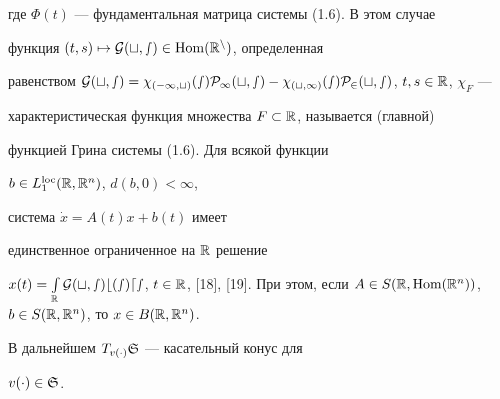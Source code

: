 где $\Phi(t)$ --- фундаментальная матрица системы (1.6). В этом случае


функция $(t,s)\mapsto\cal G(t,s)\in\operatorname{Hom}(\Bbb R^{n})$, определенная


равенством $\pG(t,s)=\chi_{(-\infty,t)}(s)P_{1}(t,s)-


\chi_{(t,\infty)}(s)P_{2}(t,s)$, $t,s\in\R$, $\chi_{F}$ ---


характеристическая функция множества $F\subset\Bbb R$, называется (главной)


функцией Грина системы (1.6). Для всякой функции


$b\in L_{1}^{\operatorname{loc}}(\Bbb R,\Bbb R^{n})$, $d(b,0)<\infty$,


система $\Dot x=A(t)x+b(t)$ имеет


единственное ограниченное на $\Bbb R$ решение


$x(t)=\int\lt_{\R}\pG(t,s)b(s)ds$, $t\in\R$, [18], [19]. При этом, если $A\in


S(\R,\Hom(\R^{n}))$, $b\in S(\R,\R^{n})$, то $x\in B(\R,\R^{n})$.





В дальнейшем $T_{v(\cdot)}\frak S$ --- касательный конус для


$v(\cdot)\in\frak S$.





